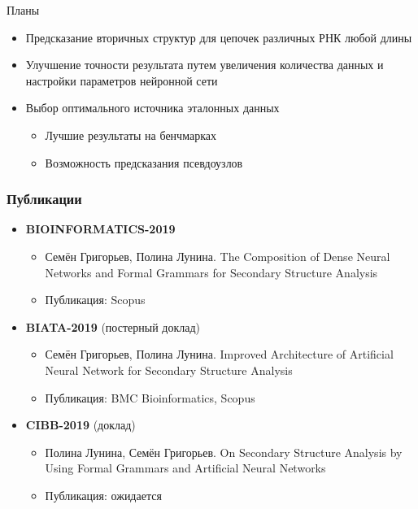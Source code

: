 \documentclass{beamer}
\begin{document}
\begin{frame}{Планы}
\begin{itemize}
    \item Предсказание вторичных структур для цепочек различных РНК любой длины
    \item Улучшение точности результата путем увеличения количества данных и настройки параметров нейронной сети 
    \item Выбор оптимального источника эталонных данных
    \begin{itemize}
        \item Лучшие результаты на бенчмарках
        \item Возможность предсказания псевдоузлов
    \end{itemize}
\end{itemize}

\end{frame}

\begin{frame}\frametitle{Публикации}
\begin{itemize}
    \item \textbf{BIOINFORMATICS-2019}
      \begin{itemize}
        \item Семён Григорьев, Полина Лунина. The Composition of Dense Neural Networks and Formal Grammars for Secondary Structure Analysis
        \item Публикация: Scopus
      \end{itemize}
      \item \textbf{BIATA-2019} (постерный доклад)
      \begin{itemize}
         \item Семён Григорьев, Полина Лунина. Improved Architecture of Artificial Neural Network for Secondary Structure Analysis
         \item Публикация: BMC Bioinformatics, Scopus
      \end{itemize}
      \item \textbf{CIBB-2019} (доклад)
      \begin{itemize}
        \item Полина Лунина, Семён Григорьев. On Secondary Structure Analysis by Using Formal Grammars and Artificial Neural Networks
        \item Публикация: ожидается
      \end{itemize}
\end{itemize}

\end{frame}
\end{document}
